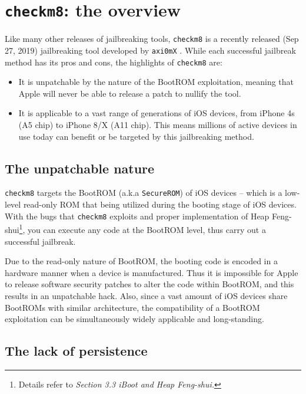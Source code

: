 \documentclass[10pt]{article}
\newcommand{\inlinecode}{\texttt}
\begin{document}
\section{\inlinecode{checkm8}: the overview}

Like many other releases of jailbreaking tools, \inlinecode{checkm8} is a recently released (Sep 27, 2019) jailbreaking tool developed by \inlinecode{axi0mX} \cite{cite:2}. While each successful jailbreak method has its pros and cons, the highlights of \inlinecode{checkm8} are:
\begin{itemize}
    \item It is unpatchable by the nature of the BootROM exploitation, meaning that Apple will never be able to release a patch to nullify the tool.
    \item It is applicable to a vast range of generations of iOS devices, from iPhone 4s (A5 chip) to iPhone 8/X (A11 chip). This means millions of active devices in use today can benefit or be targeted by this jailbreaking method.
\end{itemize}

\subsection{The unpatchable nature}

\inlinecode{checkm8} targets the BootROM (a.k.a \inlinecode{SecureROM}) of iOS devices -- which is a low-level read-only ROM that being utilized during the booting stage of iOS devices. With the bugs that \inlinecode{checkm8} exploits and proper implementation of Heap Feng-shui\footnote{Details refer to \textit{Section 3.3 iBoot and Heap Feng-shui.}}, you can execute any code at the BootROM level, thus carry out a successful jailbreak.

Due to the read-only nature of BootROM, the booting code is encoded in a hardware manner when a device is manufactured. Thus it is impossible for Apple to release software security patches to alter the code within BootROM, and this results in an unpatchable hack. Also, since a vast amount of iOS devices share BootROMs with similar architecture, the compatibility of a BootROM exploitation can be simultaneously widely applicable and long-standing.

\subsection{The lack of persistence}
\end{document}
